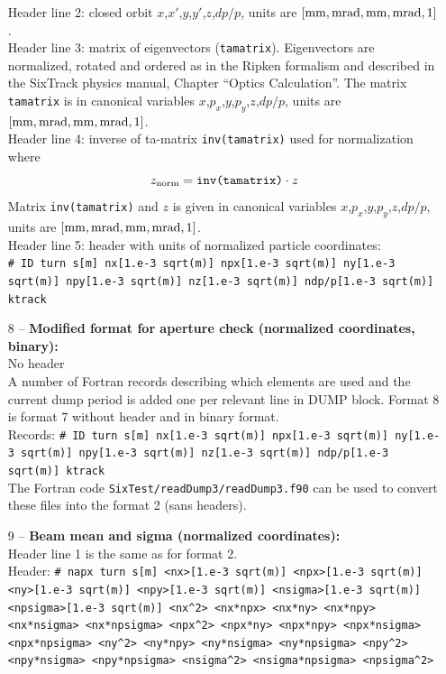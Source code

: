 \begin{enumerate}
     Header line 2: closed orbit  $x$,$x'$,$y$,$y'$,$z$,$dp/p$, units are $[\rm mm,mrad,mm,mrad,1]$.\\
     Header line 3: matrix of eigenvectors (\texttt{tamatrix}). Eigenvectors are normalized, rotated and ordered as in the Ripken formalism and described in the SixTrack physics manual, Chapter ``Optics Calculation''. The matrix \texttt{tamatrix} is in canonical variables $x$,$p_x$,$y$,$p_y$,$z$,$dp/p$, units are $[\rm mm,mrad,mm,mrad,1]$. \\
     Header line 4: inverse of ta-matrix \texttt{inv(tamatrix)} used for normalization where \begin{equation}
		z_{\rm norm}=\texttt{inv(tamatrix)}\cdot z
     \end{equation}
     Matrix \texttt{inv(tamatrix)} and $z$ is given in canonical variables $x$,$p_x$,$y$,$p_y$,$z$,$dp/p$, units are \linebreak $[\rm mm,mrad,mm,mrad,1]$.\\
     Header line 5: header with units of normalized particle coordinates:\\
     \texttt{\# ID turn s[m] nx[1.e-3 sqrt(m)] npx[1.e-3 sqrt(m)] ny[1.e-3 sqrt(m)] npy[1.e-3 sqrt(m)] nz[1.e-3 sqrt(m)] ndp/p[1.e-3 sqrt(m)] ktrack}\\
    \item[8] -- \textbf{Modified format for aperture check (normalized coordinates, binary):}\\
	No header\\
	A number of Fortran records describing which elements are used and the current dump period is added one per relevant line in DUMP block. Format 8 is format 7 without header and in binary format.\\
	Records: \texttt{\# ID turn s[m] nx[1.e-3 sqrt(m)] npx[1.e-3 sqrt(m)] ny[1.e-3 sqrt(m)] npy[1.e-3 sqrt(m)] nz[1.e-3 sqrt(m)] ndp/p[1.e-3 sqrt(m)] ktrack}\\
	The Fortran code \texttt{SixTest/readDump3/readDump3.f90} can be used to convert these files into the format 2 (sans headers).
	\item[9] -- \textbf{Beam mean and sigma (normalized coordinates):}\\
	Header line 1 is the same as for format 2.\\
	Header: \texttt{\# napx turn s[m] <nx>[1.e-3 sqrt(m)] <npx>[1.e-3 sqrt(m)] <ny>[1.e-3 sqrt(m)] <npy>[1.e-3 sqrt(m)] <nsigma>[1.e-3 sqrt(m)] <npsigma>[1.e-3 sqrt(m)] <nx\^{}2> <nx*npx> <nx*ny> <nx*npy> <nx*nsigma> <nx*npsigma> <npx\^{}2> <npx*ny> <npx*npy> <npx*nsigma> <npx*npsigma> <ny\^{}2> <ny*npy> <ny*nsigma> <ny*npsigma> <npy\^{}2> <npy*nsigma> <npy*npsigma> <nsigma\^{}2> <nsigma*npsigma> <npsigma\^{}2>}\\

\end{enumerate}
